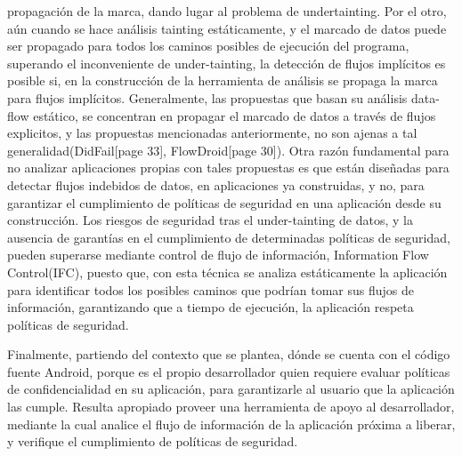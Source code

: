 propagación de la marca, dando lugar al problema de
undertainting\cite{dynamic-tainting}\cite{Bit-Level-Taint-Analysis}.\newline 
Por el otro, aún cuando se hace análisis tainting estáticamente, y el marcado de
datos puede ser propagado para todos los caminos posibles de ejecución  del
programa, superando el inconveniente de under-tainting, la detección de flujos
implícitos es posible si, en la construcción de la herramienta de análisis
se propaga la marca para flujos implícitos\cite{taint-analysis}. Generalmente,
las propuestas que basan su análisis data-flow estático, se concentran en propagar el marcado de
datos a través de flujos explicitos, y las propuestas mencionadas anteriormente,
no son ajenas a tal generalidad(DidFail\cite{DidFail}[page 33],
FlowDroid\cite{FlowDroid-Thesis}[page 30]).\newline
Otra razón fundamental para no  analizar aplicaciones propias con tales
propuestas es que están diseñadas para detectar flujos indebidos de datos, en
aplicaciones ya construidas, y no, para garantizar el cumplimiento de políticas
de seguridad en una aplicación desde su construcción.\newline 
Los riesgos de seguridad tras el under-tainting de datos, y la ausencia de garantías en el cumplimiento de determinadas políticas de seguridad, pueden
superarse mediante control de flujo de información, Information Flow
Control(IFC), puesto que, con esta técnica se analiza estáticamente la
aplicación para identificar todos los posibles caminos que podrían tomar sus
flujos de información, garantizando que a tiempo de ejecución, la
aplicación respeta políticas de seguridad.

Finalmente, partiendo del contexto que se plantea, dónde se cuenta con el código
fuente Android, porque es el propio desarrollador quien requiere evaluar
políticas de confidencialidad en su aplicación, para  garantizarle
al usuario que la aplicación las cumple. Resulta apropiado proveer una
herramienta de apoyo al desarrollador, mediante la cual analice el flujo de
información de la aplicación próxima a liberar, y verifique el cumplimiento de
políticas de seguridad.
 
















